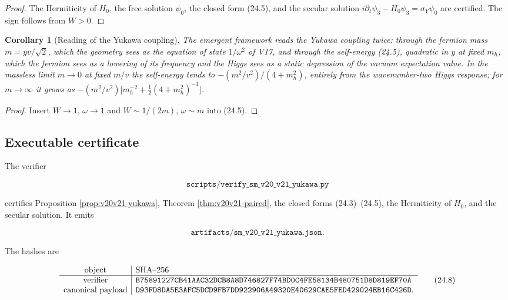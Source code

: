 \documentclass[11pt]{article}
\newtheorem{corollary}[theorem]{Corollary}
\theoremstyle{remark}
\begin{document}
\begin{proof}
The Hermiticity of \(H_0\), the free solution \(\psi_0\), the closed
form (24.5), and the secular solution
\(i\partial_t\psi_3-H_0\psi_3=\sigma_Y\psi_0\) are certified.  The sign
follows from \(W>0\).
\end{proof}

\begin{corollary}[Reading of the Yukawa coupling]
\label{cor:v20v21-reading}
The emergent framework reads the Yukawa coupling twice: through the
fermion mass \(m=yv/\sqrt2\), which the geometry sees as the equation
of state \(1/\omega^2\) of V17, and through the self-energy (24.5),
quadratic in \(y\) at fixed \(m_h\), which the fermion sees as a
lowering of its frequency and the Higgs sees as a static depression of
the vacuum expectation value.  In the massless limit \(m\to0\) at fixed
\(m/v\) the self-energy tends to \(-(m^2/v^2)/(4+m_h^2)\), entirely from
the wavenumber-two Higgs response; for \(m\to\infty\) it grows as
\(-(m^2/v^2)\bigl[m_h^{-2}+\tfrac12(4+m_h^2)^{-1}\bigr]\).
\end{corollary}

\begin{proof}
Insert \(W\to1\), \(\omega\to1\) and \(W\sim1/(2m)\), \(\omega\sim m\)
into (24.5).
\end{proof}

\subsection{Executable certificate}

The verifier

\[
 \texttt{scripts/verify\_sm\_v20\_v21\_yukawa.py}                     \tag{24.6}
\]

certifies Proposition \ref{prop:v20v21-yukawa}, Theorem
\ref{thm:v20v21-paired}, the closed forms (24.3)--(24.5), the
Hermiticity of \(H_0\), and the secular solution.  It emits

\[
 \texttt{artifacts/sm\_v20\_v21\_yukawa.json}.                        \tag{24.7}
\]

The hashes are

\[
\begin{array}{c|l}
\hbox{object}&\hbox{SHA--256}\\ \hline
\hbox{verifier}&
\texttt{B75891227CB41AAC32DCB8A8D746827F74BD0C4FE58134B480751D8D819EF70A}\\
\hbox{canonical payload}&
\texttt{D93FD8DA5E3AFC5DCD9FB7DD922906A49320E40629CAE5FED429024EB16C426D}.
\end{array}                                                     \tag{24.8}
\]
\end{document}
